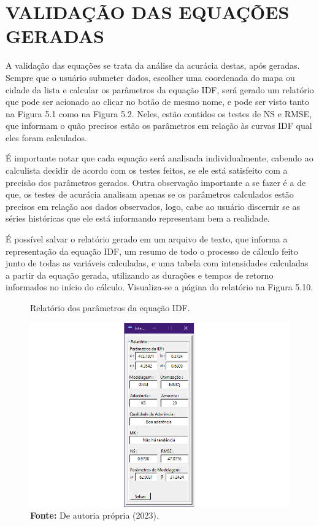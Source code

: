 \section{VALIDAÇÃO DAS EQUAÇÕES GERADAS}

A validação das equações se trata da análise da acurácia destas, após geradas. Sempre que o usuário submeter dados, escolher uma coordenada do mapa ou cidade da lista e calcular os parâmetros da equação IDF, será gerado um relatório que pode ser acionado ao clicar no botão de mesmo nome, e pode ser visto tanto na Figura 5.1 como na Figura 5.2. Neles, estão contidos os testes de NS e RMSE, que informam o quão precisos estão os parâmetros em relação às curvas IDF qual eles foram calculados.

É importante notar que cada equação será analisada individualmente, cabendo ao calculista decidir de acordo com os testes feitos, se ele está satisfeito com a precisão dos parâmetros gerados. Outra observação importante a se fazer é a de que, os testes de acurácia analisam apenas se os parâmetros calculados estão precisos em relação aos dados observados, logo, cabe ao usuário discernir se as séries históricas que ele está informando representam bem a realidade.

É possível salvar o relatório gerado em um arquivo de texto, que informa a representação da equação IDF, um resumo de todo o processo de cálculo feito junto de todas as variáveis calculadas, e uma tabela com intensidades calculadas a partir da equação gerada, utilizando as durações e tempos de retorno informados no início do cálculo. Visualiza-se a página do relatório na Figura 5.10.

\newpage

\begin{figure}[!ht]
	\centering
	\caption{Relatório dos parâmetros da equação IDF.}
	\includegraphics[width=.7625\linewidth]{figuras/relatorio_de_equacoes.png}
	\caption*{\textbf{Fonte:} De autoria própria (2023).}
	\label{fig:figuras/relatorio_de_equacoes.png}
\end{figure}

